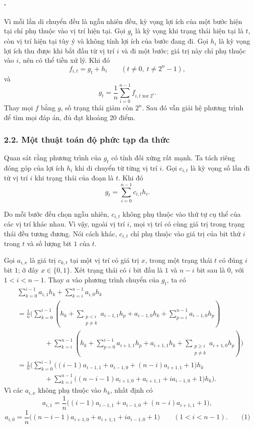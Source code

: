 \documentclass[11pt]{article}
\begin{document}
\paragraph{.}
Vì mỗi lần di chuyển đều là ngẫu nhiên đều, kỳ vọng lợi ích của một bước hiện
tại chỉ phụ thuộc vào vị trí hiện tại. Gọi \(g_t\) là kỳ vọng khi trạng thái
hiện tại là \(t\), còn vị trí hiện tại tùy ý và không tính lợi ích của bước
đang đi. Gọi \(h_i\) là kỳ vọng lợi ích thu được khi bắt đầu từ vị trí \(i\)
và đi một bước; giá trị này chỉ phụ thuộc vào \(i\), nên có thể tiền xử lý.
Khi đó
\[
  f_{i,t}=g_t+h_i \qquad (t\ne 0,\ t\ne 2^n-1),
\]
và
\[
  g_t=\frac1n\sum_{i=0}^{n-1} f_{i,t\operatorname{xor}2^i}.
\]
Thay mọi \(f\) bằng \(g\), số trạng thái giảm còn \(2^n\). Sau đó vẫn giải hệ
phương trình để tìm mọi đáp án, đủ đạt khoảng 20 điểm.

\subsubsection*{2.2. Một thuật toán độ phức tạp đa thức}

Quan sát rằng phương trình của \(g_t\) có tính đối xứng rất mạnh. Ta tách riêng
đóng góp của lợi ích \(h_i\) khi di chuyển từ từng vị trí \(i\). Gọi
\(c_{i,t}\) là kỳ vọng số lần đi từ vị trí \(i\) khi trạng thái của đoạn là
\(t\). Khi đó
\[
  g_t=\sum_{i=0}^{n-1} c_{i,t}h_i.
\]

Do mỗi bước đều chọn ngẫu nhiên, \(c_{i,t}\) không phụ thuộc vào thứ tự cụ thể
của các vị trí khác nhau. Vì vậy, ngoài vị trí \(i\), mọi vị trí có cùng giá
trị trong trạng thái đều tương đương. Nói cách khác, \(c_{i,t}\) chỉ phụ
thuộc vào giá trị của bit thứ \(i\) trong \(t\) và số lượng bit \(1\) của
\(t\).

Gọi \(a_{i,x}\) là giá trị \(c_{k,t}\) tại một vị trí có giá trị \(x\), trong
một trạng thái \(t\) có đúng \(i\) bit \(1\); ở đây \(x\in\{0,1\}\). Xét trạng
thái có \(i\) bit đầu là \(1\) và \(n-i\) bit sau là \(0\), với
\(1<i<n-1\). Thay \(a\) vào phương trình chuyển của \(g_t\), ta có
\[
\begin{aligned}
&\sum_{k=0}^{i-1}a_{i,1}h_k+\sum_{k=i}^{n-1}a_{i,0}h_k\\
&=\frac1n\Biggl(
\sum_{k=0}^{i-1}\left(h_k+\sum_{\substack{p<i\\p\ne k}}a_{i-1,1}h_p
  +a_{i-1,0}h_k+\sum_{p=i}^{n-1}a_{i-1,0}h_p\right)\\
&\qquad\qquad+
\sum_{k=i}^{n-1}\left(h_k+\sum_{p=0}^{i-1}a_{i+1,1}h_p
  +a_{i+1,1}h_k+\sum_{\substack{p\ge i\\p\ne k}}a_{i+1,0}h_p\right)
\Biggr)\\
&=\frac1n\Biggl(
\sum_{k=0}^{i-1}\bigl((i-1)a_{i-1,1}+a_{i-1,0}
  +(n-i)a_{i+1,1}+1\bigr)h_k\\
&\qquad\qquad+
\sum_{k=i}^{n-1}\bigl((n-i-1)a_{i+1,0}+a_{i+1,1}
  +ia_{i-1,0}+1\bigr)h_k
\Biggr).
\end{aligned}
\]
Vì các \(a_{i,x}\) không phụ thuộc vào \(h_k\), nhất định có
\[
  a_{i,1}=\frac1n\bigl((i-1)a_{i-1,1}+a_{i-1,0}
    +(n-i)a_{i+1,1}+1\bigr),
\]
\[
  a_{i,0}=\frac1n\bigl((n-i-1)a_{i+1,0}+a_{i+1,1}
    +ia_{i-1,0}+1\bigr)
  \qquad (1<i<n-1). \qquad\text{(1)}
\]
\end{document}
